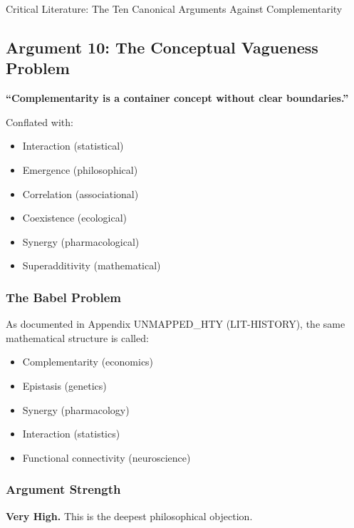 \begin{chapter}{Critical Literature: The Ten Canonical Arguments Against Complementarity}
\subsection{Argument 10: The Conceptual Vagueness Problem}
\label{sec:arg-vagueness}

\begin{tcolorbox}[colback=red!5!white,colframe=red!75!black,title=\textbf{Core Claim}]
\textbf{``Complementarity is a container concept without clear boundaries.''}

Conflated with:
\begin{itemize}[noitemsep]
    \item Interaction (statistical)
    \item Emergence (philosophical)
    \item Correlation (associational)
    \item Coexistence (ecological)
    \item Synergy (pharmacological)
    \item Superadditivity (mathematical)
\end{itemize}
\end{tcolorbox}

\subsubsection{The Babel Problem}

As documented in Appendix UNMAPPED_HTY (LIT-HISTORY), the same mathematical structure is called:
\begin{itemize}[noitemsep]
    \item Complementarity (economics)
    \item Epistasis (genetics)
    \item Synergy (pharmacology)
    \item Interaction (statistics)
    \item Functional connectivity (neuroscience)
\end{itemize}

\subsubsection{Argument Strength}

\textbf{Very High.} This is the deepest philosophical objection.


\end{chapter}

